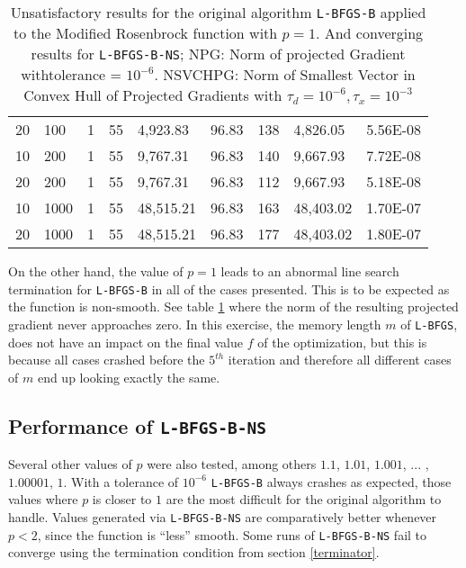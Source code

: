 \begin{table}
\begin{center}
\begin{tabular}{|l|l|l|l|l|l|l|l|l|}
      20 & 100 & 1 & 55 & 4,923.83 & 96.83 & 138 & 4,826.05 & 5.56E-08 \\
      10 & 200 & 1 & 55 & 9,767.31 & 96.83 & 140 & 9,667.93 & 7.72E-08 \\
      20 & 200 & 1 & 55 & 9,767.31 & 96.83 & 112 & 9,667.93 & 5.18E-08 \\
      10 & 1000 & 1 & 55 & 48,515.21 & 96.83 & 163 & 48,403.02 & 1.70E-07 \\
      20 & 1000 & 1 & 55 & 48,515.21 & 96.83 & 177 & 48,403.02 & 1.80E-07 \\
      \hline
    \end{tabular}
    \caption[Modified Rosenbrock with $p = 1$]{Unsatisfactory results for the original algorithm \texttt{L-BFGS-B} applied to the Modified Rosenbrock function with $p = 1$. And converging results for \texttt{L-BFGS-B-NS}; NPG: Norm of projected Gradient withtolerance = $10^{-6}$. NSVCHPG: Norm of Smallest Vector in Convex Hull of Projected Gradients with $\tau_d = 10^{-6}, \tau_x = 10^{-3}$}
  \label{pequal1merged}
  \end{center}
\end{table}

On the other hand, the value of $p = 1$ leads to an abnormal line search termination for \texttt{L-BFGS-B} in all of the cases presented. This is to be expected as the function is non-smooth. See table \ref{pequal1merged} where the norm of the resulting projected gradient never approaches zero. In this exercise, the memory length $m$ of \texttt{L-BFGS}, does not have an impact on the final value $f$ of the optimization, but this is because all cases crashed before the $5^{th}$ iteration and therefore all different cases of $m$ end up looking exactly the same.

\subsection{Performance of \texttt{L-BFGS-B-NS}}

Several other values of $p$ were also tested, among others $1.1$, $1.01$, $1.001$, ... , $1.00001$, $1$. With a tolerance of $10^{-6}$ \texttt{L-BFGS-B} always crashes as expected, those values where $p$ is closer to $1$ are the most difficult for the original algorithm to handle.  Values generated via \texttt{L-BFGS-B-NS} are comparatively better whenever $p < 2$, since the function is ``less'' smooth. Some runs of \texttt{L-BFGS-B-NS} fail to converge using the termination condition from section \ref{terminator}.

